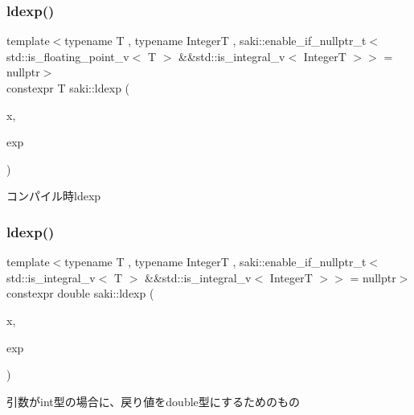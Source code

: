 \subsubsection{\texorpdfstring{ldexp()}{ldexp()}\hspace{0.1cm}{\footnotesize\ttfamily [1/2]}}
{\footnotesize\ttfamily template$<$typename T , typename IntegerT , saki\+::enable\+\_\+if\+\_\+nullptr\+\_\+t$<$ std\+::is\+\_\+floating\+\_\+point\+\_\+v$<$ T $>$ \&\&std\+::is\+\_\+integral\+\_\+v$<$ Integer\+T $>$$>$  = nullptr$>$ \\
constexpr T saki\+::ldexp (\begin{DoxyParamCaption}\item[{T}]{x,  }\item[{IntegerT}]{exp }\end{DoxyParamCaption})}



コンパイル時ldexp 

\mbox{\label{namespacesaki_ad9202fb752e29a81d507ef9a0f8e8bd5}} 
\subsubsection{\texorpdfstring{ldexp()}{ldexp()}\hspace{0.1cm}{\footnotesize\ttfamily [2/2]}}
{\footnotesize\ttfamily template$<$typename T , typename IntegerT , saki\+::enable\+\_\+if\+\_\+nullptr\+\_\+t$<$ std\+::is\+\_\+integral\+\_\+v$<$ T $>$ \&\&std\+::is\+\_\+integral\+\_\+v$<$ Integer\+T $>$$>$  = nullptr$>$ \\
constexpr double saki\+::ldexp (\begin{DoxyParamCaption}\item[{T}]{x,  }\item[{IntegerT}]{exp }\end{DoxyParamCaption})}



引数がint型の場合に、戻り値をdouble型にするためのもの 

\mbox{\label{namespacesaki_aca2e4449261f40ee6f47abc49844e66c}} 
